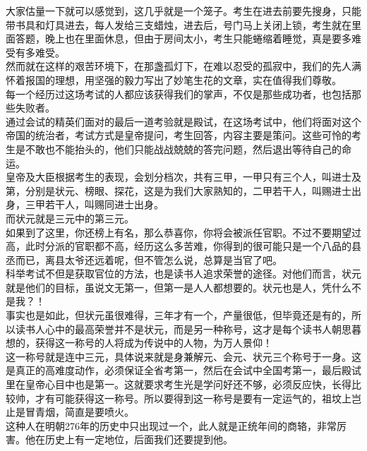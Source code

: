 \begin{multicols}{\theparacolNo}
大家估量一下就可以感觉到，这几乎就是一个笼子。考生在进去前要先搜身，只能带书具和灯具进去，每人发给三支蜡烛，进去后，号门马上关闭上锁，考生就在里面答题，晚上也在里面休息，但由于房间太小，考生只能蜷缩着睡觉，真是要多难受有多难受。\\

然而就在这样的艰苦环境下，在那盏孤灯下，在难以忍受的孤寂中，我们的先人满怀着报国的理想，用坚强的毅力写出了妙笔生花的文章，实在值得我们尊敬。\\

每一个经历过这场考试的人都应该获得我们的掌声，不仅是那些成功者，也包括那些失败者。\\

通过会试的精英们面对的最后一道考验就是殿试，在这场考试中，他们将面对这个帝国的统治者，考试方式是皇帝提问，考生回答，内容主要是策问。这些可怜的考生是不敢也不能抬头的，他们只能战战兢兢的答完问题，然后退出等待自己的命运。\\

皇帝及大臣根据考生的表现，会划分档次，共有三甲，一甲只有三个人，叫进士及第，分别是状元、榜眼、探花，这是为我们大家熟知的，二甲若干人，叫赐进士出身，三甲若干人，叫赐同进士出身。\\

而状元就是三元中的第三元。\\

如果到了这里，你还榜上有名，那么恭喜你，你将会被派任官职。不过不要期望过高，此时分派的官职都不高，经历这么多苦难，你得到的很可能只是一个八品的县丞而已，离县太爷还远着呢，但不管怎么说，总算是当官了吧。\\

科举考试不但是获取官位的方法，也是读书人追求荣誉的途径。对他们而言，状元就是他们的目标，虽说文无第一，但第一是人人都想要的。状元也是人，凭什么不是我？！\\

事实也是如此，但状元虽很难得，三年才有一个，产量很低，但毕竟还是有的，所以读书人心中的最高荣誉并不是状元，而是另一种称号，这才是每个读书人朝思暮想的，获得这一称号的人将成为传说中的人物，为万人景仰！\\

这一称号就是连中三元，具体说来就是身兼解元、会元、状元三个称号于一身。这是真正的高难度动作，必须保证全省考第一，然后在会试中全国考第一，最后殿试里在皇帝心目中也是第一。这就要求考生光是学问好还不够，必须反应快，长得比较帅，才有可能获得这一称号。所以要得到这一称号是要有一定运气的，祖坟上岂止是冒青烟，简直是要喷火。\\

这种人在明朝276年的历史中只出现过一个，此人就是正统年间的商辂，非常厉害。他在历史上有一定地位，后面我们还要提到他。\\


\end{multicols}

